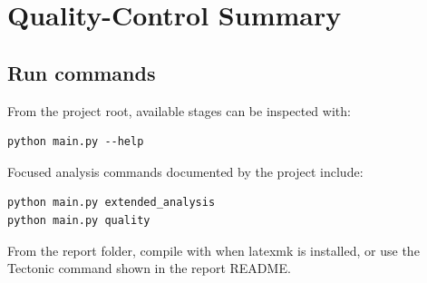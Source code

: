\chapter{Quality-Control Summary}
\label{app:qc}



\section{Run commands}
From the project root, available stages can be inspected with:
\begin{lstlisting}[basicstyle=\ttfamily\small,frame=single,backgroundcolor=\color{ProjectGrey}]
python main.py --help
\end{lstlisting}

Focused analysis commands documented by the project include:
\begin{lstlisting}[basicstyle=\ttfamily\small,frame=single,backgroundcolor=\color{ProjectGrey}]
python main.py extended_analysis
python main.py quality
\end{lstlisting}

From the report folder, compile with  when latexmk is installed, or use the Tectonic command shown in the report README.
